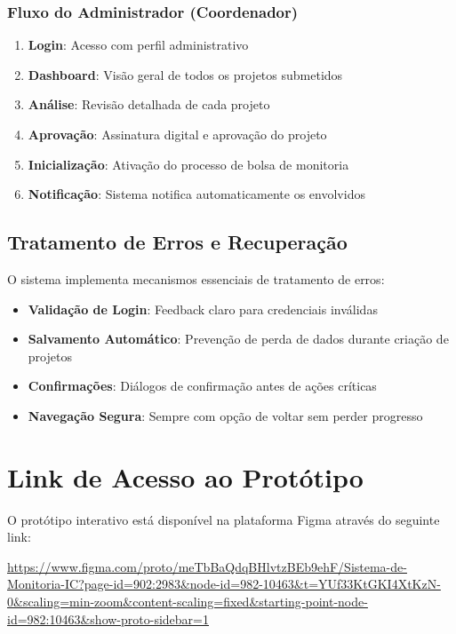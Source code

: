\documentclass[12pt, a4paper]{report}
\begin{document}
\subsubsection{Fluxo do Administrador (Coordenador)}
\begin{enumerate}
    \item \textbf{Login}: Acesso com perfil administrativo
    \item \textbf{Dashboard}: Visão geral de todos os projetos submetidos
    \item \textbf{Análise}: Revisão detalhada de cada projeto
    \item \textbf{Aprovação}: Assinatura digital e aprovação do projeto
    \item \textbf{Inicialização}: Ativação do processo de bolsa de monitoria
    \item \textbf{Notificação}: Sistema notifica automaticamente os envolvidos
\end{enumerate}

\subsection{Tratamento de Erros e Recuperação}

O sistema implementa mecanismos essenciais de tratamento de erros:

\begin{itemize}
    \item \textbf{Validação de Login}: Feedback claro para credenciais inválidas
    \item \textbf{Salvamento Automático}: Prevenção de perda de dados durante criação de projetos
    \item \textbf{Confirmações}: Diálogos de confirmação antes de ações críticas
    \item \textbf{Navegação Segura}: Sempre com opção de voltar sem perder progresso
\end{itemize}

\section{Link de Acesso ao Protótipo}

O protótipo interativo está disponível na plataforma Figma através do seguinte link:

\url{https://www.figma.com/proto/meTbBaQdqBHlvtzBEb9ehF/Sistema-de-Monitoria-IC?page-id=902:2983&node-id=982-10463&t=YUf33KtGKI4XtKzN-0&scaling=min-zoom&content-scaling=fixed&starting-point-node-id=982:10463&show-proto-sidebar=1}
\end{document}
